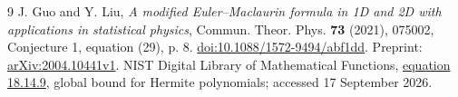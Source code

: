 \documentclass[11pt]{article}
\begin{document}
\begin{thebibliography}{9}
J. Guo and Y. Liu, \emph{A modified Euler--Maclaurin formula in 1D and
2D with applications in statistical physics}, Commun. Theor. Phys.
\textbf{73} (2021), 075002, Conjecture 1, equation (29), p. 8.
\href{https://doi.org/10.1088/1572-9494/abf1dd}{doi:10.1088/1572-9494/abf1dd}.
Preprint: \href{https://arxiv.org/abs/2004.10441}{arXiv:2004.10441v1}.
NIST Digital Library of Mathematical Functions,
\href{https://dlmf.nist.gov/18.14.E9}{equation 18.14.9},
global bound for Hermite polynomials; accessed 17 September 2026.
\end{thebibliography}
\end{document}
